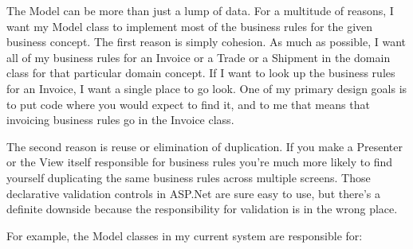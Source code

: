 \documentclass{article}
\begin{document}
{The Model can be more than just a lump of data.  For a multitude of reasons, I want my Model class to implement most of the business rules for the given business concept.  The first reason is simply cohesion.  As much as possible, I want all of my business rules for an Invoice or a Trade or a Shipment in the domain class for that particular domain concept.  If I want to look up the business rules for an Invoice, I want a single place to go look.  One of my primary design goals is to put code where you would expect to find it, and to me that means that invoicing business rules go in the Invoice class.

The second reason is reuse or elimination of duplication.  If you make a Presenter or the View itself responsible for business rules you're much more likely to find yourself duplicating the same business rules across multiple screens.  Those declarative validation controls in ASP.Net are sure easy to use, but there's a definite downside because the responsibility for validation is in the wrong place.

For example, the Model classes in my current system are responsible for:

}
\end{document}
